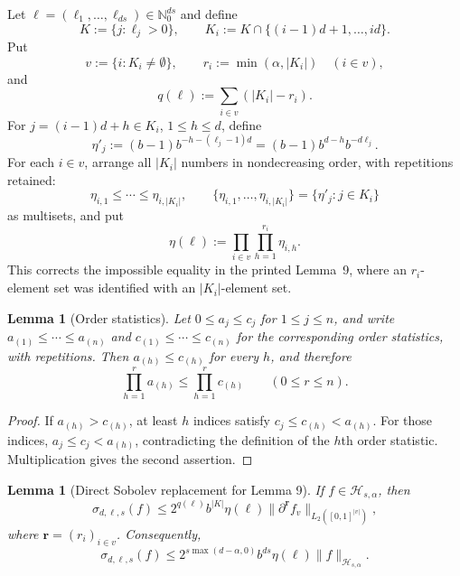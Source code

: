 \documentclass[11pt]{article}
\newtheorem{lemma}[theorem]{Lemma}
\newcommand{\Nzero}{\mathbb N_0}
\newcommand{\abs}[1]{\lvert #1\rvert}
\newcommand{\norm}[1]{\lVert #1\rVert}
\newcommand{\set}[1]{\{#1\}}
\begin{document}
Let $\boldsymbol\ell=(\ell_1,\ldots,\ell_{ds})\in\Nzero^{ds}$ and define
\[
 K:=\set{j:\ell_j>0},\qquad
 K_i:=K\cap\set{(i-1)d+1,\ldots,id}.
\]
Put
\[
 v:=\set{i:K_i\ne\emptyset},\qquad
 r_i:=\min(\alpha,\abs{K_i})\quad(i\in v),
\]
and
\begin{equation}\label{eq:q-def}
 q(\boldsymbol\ell):=\sum_{i\in v}(\abs{K_i}-r_i).
\end{equation}
For $j=(i-1)d+h\in K_i$, $1\le h\le d$, define
\begin{equation}\label{eq:eta-j}
 \eta'_j:=(b-1)b^{-h-(\ell_j-1)d}
          =(b-1)b^{d-h}b^{-d\ell_j}.
\end{equation}
For each $i\in v$, arrange all $\abs{K_i}$ numbers in nondecreasing order,
with repetitions retained:
\[
 \eta_{i,1}\le\cdots\le\eta_{i,\abs{K_i}},
 \qquad
 \set{\eta_{i,1},\ldots,\eta_{i,\abs{K_i}}}
 =\set{\eta'_j:j\in K_i}
\]
as multisets, and put
\begin{equation}\label{eq:eta-block}
 \eta(\boldsymbol\ell)
 :=\prod_{i\in v}\prod_{h=1}^{r_i}\eta_{i,h}.
\end{equation}
This corrects the impossible equality in the printed Lemma~9, where an
$r_i$-element set was identified with an $\abs{K_i}$-element set.

\begin{lemma}[Order statistics]\label{lem:order-statistics}
Let $0\le a_j\le c_j$ for $1\le j\le n$, and write
$a_{(1)}\le\cdots\le a_{(n)}$ and
$c_{(1)}\le\cdots\le c_{(n)}$ for the corresponding order statistics, with
repetitions.  Then $a_{(h)}\le c_{(h)}$ for every $h$, and therefore
\[
 \prod_{h=1}^r a_{(h)}\le\prod_{h=1}^r c_{(h)}
 \qquad(0\le r\le n).
\]
\end{lemma}

\begin{proof}
If $a_{(h)}>c_{(h)}$, at least $h$ indices satisfy
$c_j\le c_{(h)}<a_{(h)}$.  For those indices,
$a_j\le c_j<a_{(h)}$, contradicting the definition of the $h$th order
statistic.  Multiplication gives the second assertion.
\end{proof}

\begin{lemma}[Direct Sobolev replacement for Lemma 9]\label{lem:block-decay}
If $f\in\mathcal H_{s,\alpha}$, then
\begin{equation}\label{eq:sobolev-block-local}
 \sigma_{d,\boldsymbol\ell,s}(f)
 \le 2^{q(\boldsymbol\ell)}b^{\abs K}
      \eta(\boldsymbol\ell)
      \norm{\partial^{\boldsymbol r}f_v}_{L_2([0,1]^{\abs v})},
\end{equation}
where $\boldsymbol r=(r_i)_{i\in v}$.  Consequently,
\begin{equation}\label{eq:sobolev-block}
 \sigma_{d,\boldsymbol\ell,s}(f)
 \le 2^{s\max(d-\alpha,0)}b^{ds}
      \eta(\boldsymbol\ell)\norm f_{\mathcal H_{s,\alpha}}.
\end{equation}
\end{lemma}
\end{document}
